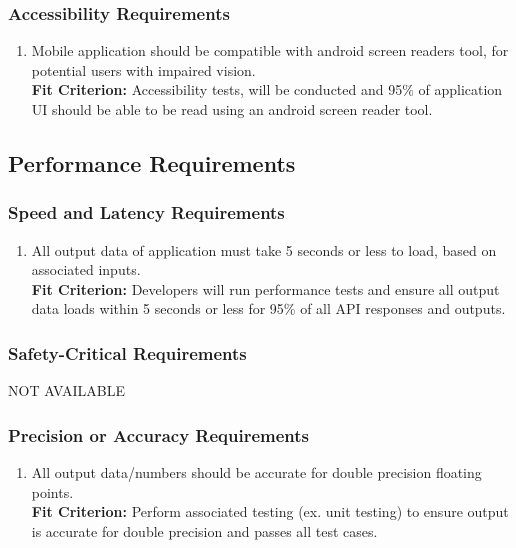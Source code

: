 \documentclass[12pt,letterpaper]{article}
\begin{document}
\subsubsection{Accessibility Requirements}
\begin{enumerate}[resume*] 
	\item Mobile application should be compatible with android screen readers tool, for potential users with impaired vision.\\
	{\textbf{Fit Criterion:} Accessibility tests, will be conducted and 95\% of application UI should be able to be read using an android screen reader tool.}
\end{enumerate}

\subsection{Performance Requirements}
\subsubsection{Speed and Latency Requirements}
\begin{enumerate}[{PE}1.] 
	\item All output data of application must take 5 seconds or less to load, based on associated inputs.\\
	{\textbf{Fit Criterion:} Developers will run performance tests and ensure all output data loads within 5 seconds or less for 95\% of all API responses and outputs.}
\end{enumerate}

\subsubsection{Safety-Critical Requirements}
\noindent NOT AVAILABLE

\subsubsection{Precision or Accuracy Requirements}
\begin{enumerate}[resume*] 
	\item All output data/numbers should be accurate for double precision floating points.\\
	{\textbf{Fit Criterion:} Perform associated testing (ex. unit testing) to ensure output is accurate for double precision and passes all test cases. }
\end{enumerate}
\end{document}
